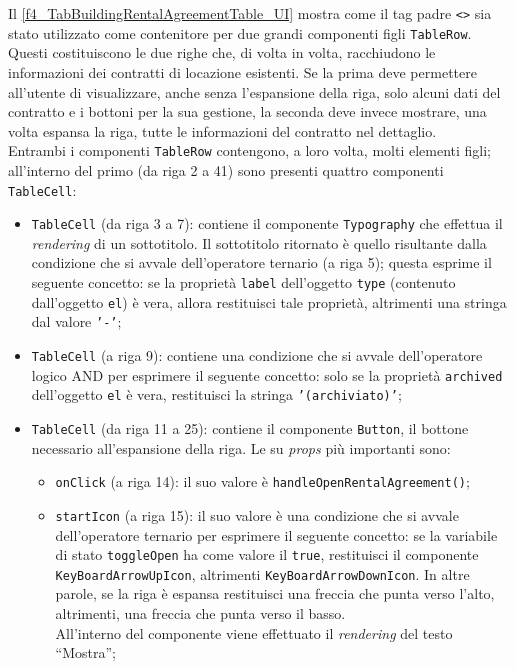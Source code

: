 Il \autoref{f4_TabBuildingRentalAgreementTable_UI} mostra come il tag padre \texttt{<>} sia stato utilizzato come contenitore per due grandi componenti figli \texttt{TableRow}. Questi costituiscono le due righe che, di volta in volta, racchiudono le informazioni dei contratti di locazione esistenti. Se la prima deve permettere all'utente di visualizzare, anche senza l'espansione della riga, solo alcuni dati del contratto e i bottoni per la sua gestione, la seconda deve invece mostrare, una volta espansa la riga, tutte le informazioni del contratto nel dettaglio.\\
Entrambi i componenti \texttt{TableRow} contengono, a loro volta, molti elementi figli; all'interno del primo (da riga 2 a 41) sono presenti quattro componenti \texttt{TableCell}:
\begin{itemize}
    \item \texttt{TableCell} (da riga 3 a 7): contiene il componente \texttt{Typography} che effettua il \textit{rendering} di un sottotitolo. Il sottotitolo ritornato è quello risultante dalla condizione che si avvale dell'operatore ternario (a riga 5); questa esprime il seguente concetto: se la proprietà \texttt{label} dell'oggetto \texttt{type} (contenuto dall'oggetto \texttt{el}) è vera, allora restituisci tale proprietà, altrimenti una stringa dal valore \texttt{'-'};
    
    \item \texttt{TableCell} (a riga 9): contiene una condizione che si avvale dell'operatore logico AND per esprimere il seguente concetto: solo se la proprietà \texttt{archived} dell'oggetto \texttt{el} è vera, restituisci la stringa \texttt{'(archiviato)'};
    
    \item \texttt{TableCell} (da riga 11 a 25): contiene il componente \texttt{Button}, il bottone necessario all'espansione della riga. Le su \textit{props} più importanti sono:
    \begin{itemize}
        \item \texttt{onClick} (a riga 14): il suo valore è \texttt{handleOpenRentalAgreement()};
        
        \item \texttt{startIcon} (a riga 15): il suo valore è una condizione che si avvale dell'operatore ternario per esprimere il seguente concetto: se la variabile di stato \texttt{toggleOpen} ha come valore il \texttt{true}, restituisci il componente \texttt{KeyBoardArrowUpIcon}, altrimenti \texttt{KeyBoardArrowDownIcon}. In altre parole, se la riga è espansa restituisci una freccia che punta verso l'alto, altrimenti, una freccia che punta verso il basso.\\
        All'interno del componente viene effettuato il \textit{rendering} del testo “Mostra”;
    \end{itemize}


\end{itemize}
